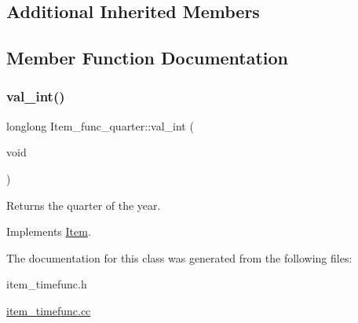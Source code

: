 \subsection*{Additional Inherited Members}


\subsection{Member Function Documentation}
\mbox{\label{classItem__func__quarter_a038ee4437fd15cecd87806fac44be81b}} 
\subsubsection{\texorpdfstring{val\+\_\+int()}{val\_int()}}
{\footnotesize\ttfamily longlong Item\+\_\+func\+\_\+quarter\+::val\+\_\+int (\begin{DoxyParamCaption}\item[{void}]{ }\end{DoxyParamCaption})\hspace{0.3cm}{\ttfamily [virtual]}}

Returns the quarter of the year. 

Implements \mbox{\hyperlink{classItem}{Item}}.



The documentation for this class was generated from the following files\+:\begin{DoxyCompactItemize}
\item 
item\+\_\+timefunc.\+h\item 
\mbox{\hyperlink{item__timefunc_8cc}{item\+\_\+timefunc.\+cc}}\end{DoxyCompactItemize}

